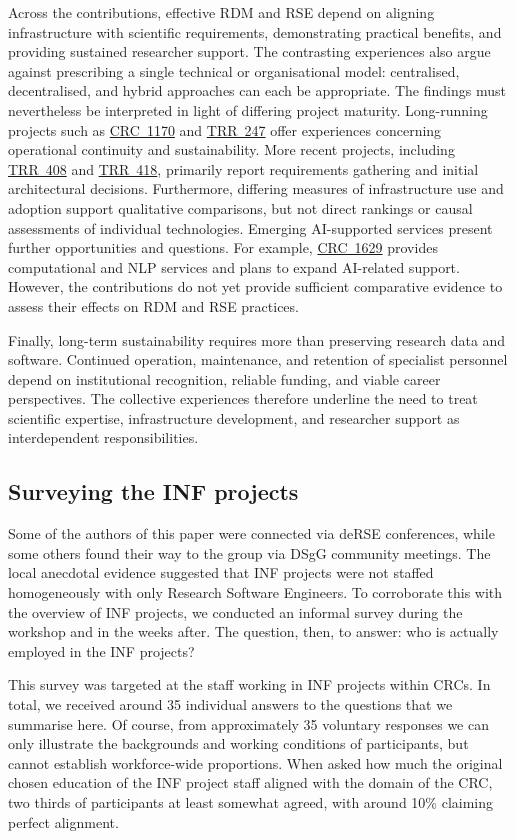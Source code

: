 \documentclass{eceasst}
\begin{document}
Across the contributions, effective RDM and RSE
depend on aligning infrastructure with scientific
requirements, demonstrating practical benefits,
and providing sustained researcher support.
The contrasting experiences also argue against
prescribing a single technical or organisational
model: centralised, decentralised, and hybrid
approaches can each be appropriate.
The findings must nevertheless be interpreted
in light of differing project maturity.
Long-running projects such as
\hyperref[subsec:crc1170]{CRC~1170} and
\hyperref[subsec:trr247]{TRR~247} offer
experiences concerning operational continuity
and sustainability.
More recent projects, including
\hyperref[subsec:trr408]{TRR~408} and
\hyperref[subsec:trr418]{TRR~418}, primarily
report requirements gathering and initial
architectural decisions.
Furthermore, differing measures of infrastructure
use and adoption support qualitative comparisons,
but not direct rankings or causal assessments
of individual technologies.
Emerging AI-supported services present further
opportunities and questions.
For example, \hyperref[subsec:crc1629]{CRC~1629}
provides computational and NLP services and
plans to expand AI-related support.
However, the contributions do not yet provide
sufficient comparative evidence to assess
their effects on RDM and RSE practices.

Finally, long-term sustainability requires more
than preserving research data and software.
Continued operation, maintenance, and retention
of specialist personnel depend on institutional
recognition, reliable funding, and viable career
perspectives.
The collective experiences therefore underline
the need to treat scientific expertise,
infrastructure development, and researcher
support as interdependent responsibilities.


\subsection{Surveying the INF projects}
Some of the authors of this paper were connected via deRSE conferences, while some others found
their way to the group via DSgG community meetings. The local anecdotal evidence suggested that INF projects
were not staffed homogeneously with only Research Software Engineers. To corroborate this with the
overview of INF projects, we conducted an informal survey during the workshop and in the weeks
after. The question, then, to answer: who is actually employed in the INF projects?

This survey was targeted at the staff working in INF projects within CRCs. In total, we received
around 35 individual answers to the questions that we summarise here.
Of course, from approximately 35 voluntary responses we can only illustrate the backgrounds and working conditions of participants, but cannot establish workforce-wide proportions.
When asked how much the
original chosen education of the INF project staff aligned with the domain of the CRC, two thirds of
participants at least somewhat agreed, with around 10\% claiming perfect alignment.
\end{document}
